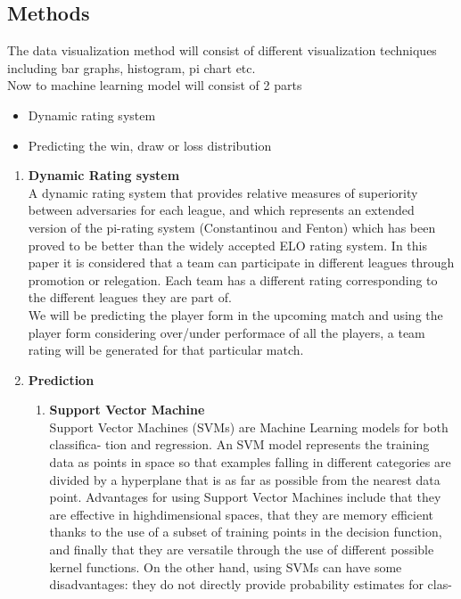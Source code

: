 \documentclass[journal]{IEEEtran}
\begin{document}
\subsection{Methods}
The data visualization method will consist
of different visualization techniques including
bar graphs, histogram, pi chart etc. \\
Now to machine learning model will consist of 2 parts
\begin{itemize}
  \item Dynamic rating system
  \item Predicting the win, draw or loss distribution
\end{itemize}

\begin{enumerate}
  \item \textbf{Dynamic Rating system} \\ A dynamic rating system that provides relative measures of superiority between adversaries
  for each league, and which represents an extended version of the pi-rating system
  (Constantinou and Fenton) which has been proved to be better than the widely accepted
  ELO rating system. In this paper it is considered that a team can participate in different leagues through promotion
  or relegation. Each team has a different rating corresponding to the different leagues
  they are part of. \\
  We will be predicting the player form in the upcoming match
  and using the player form considering over/under performace of
  all the players, a team rating will be generated for that particular
  match.
  \item \textbf{Prediction}
  \begin{enumerate}
    \item \textbf{Support Vector Machine} \\
    Support Vector Machines (SVMs) are Machine Learning models for both classifica-
tion and regression. An SVM model represents the training data as points in space so
that examples falling in different categories are divided by a hyperplane
that is as far as possible from the nearest data point.
Advantages for using Support Vector Machines include that they are effective in highdimensional
spaces, that they are memory efficient thanks to the use of a subset of
training points in the decision function, and finally that they are versatile through
the use of different possible kernel functions. On the other hand, using SVMs can
have some disadvantages: they do not directly provide probability estimates for clas-

\end{enumerate}
\end{enumerate}
\end{document}

